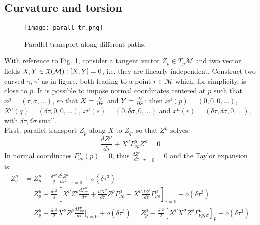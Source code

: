 \subsection{Curvature and torsion}

\begin{figure}[!b]
  \centering
  \texttt{[image: parall-tr.png]}
  \caption{Parallel transport along different paths.}
  \label{par-tr}
\end{figure}

With reference to Fig. \ref{par-tr}, consider a tangent vector $ Z_p \in T_p \mathcal{M} $ and two vector fields $ X,Y \in \mathfrak{X}(\mathcal{M}) : [X,Y] = 0 $, i.e. they are linearly independent. Construct two curved $ \gamma, \gamma' $ as in figure, both leading to a point $ r \in \mathcal{M} $ which, for simplicity, is close to $ p $. It is possible to impose normal coordinates centered at $ p $ such that $ x^\mu = (\tau, \sigma, \dots) $, so that $ X = \frac{\partial}{\partial \tau} $ and $ Y = \frac{\partial}{\partial \sigma} $: then $ x^\mu(p) = (0,0,0, \dots) $, $ X^\mu(q) = (\delta \tau, 0, 0, \dots) $, $ x^\mu(s) = (0, \delta \sigma, 0, \dots) $ and $ x^\mu(r) = (\delta \tau, \delta \sigma, 0, \dots)$, with $ \delta \tau, \delta \sigma $ small.\\
First, parallel transport $ Z_p $ along $ X $ to $ Z_q $, so that $ Z^\mu $ solves:
\begin{equation*}
  \frac{dZ^\mu}{d\tau} + X^\nu \Gamma^\mu_{\nu \rho} Z^\rho = 0
\end{equation*}
In normal coordinates $ \Gamma^\mu_{\nu \rho}(p) = 0 $, thus $ \frac{dZ^\mu}{d\tau}\big\vert_{\tau = 0} = 0 $ and the Taylor expansion is:
\begin{equation*}
  \begin{split}
    Z_q^\mu
    &= Z_p^\mu + \frac{\delta \tau^2}{2} \frac{d^2 Z^\mu}{d\tau^2}\bigg\vert_{\tau = 0} + o(\delta\tau^3) \\
    &= Z_p^\mu - \frac{\delta\tau^2}{s} \left[ X^\nu Z^\rho \frac{d\Gamma^\mu_{\nu \rho}}{d\tau} + \frac{dX^\nu}{d\tau} Z^\rho \Gamma^\mu_{\nu \rho} + X^\nu \frac{dZ^\rho}{d\tau} \Gamma^\mu_{\nu \rho} \right]_{\tau = 0} + o(\delta\tau^3) \\
    &= Z_p^\mu - \frac{\delta\tau^2}{2} X^\nu Z^\rho \frac{d\Gamma^\mu_{\nu \rho}}{d\tau}\bigg\vert_{\tau = 0} + o(\delta\tau^3) = Z_p^\mu - \frac{\delta\tau^2}{2} \left[ X^\nu X^\sigma Z^\rho \Gamma^\mu_{\nu \rho , \sigma} \right]_p + o(\delta\tau^3)
  \end{split}
\end{equation*}

